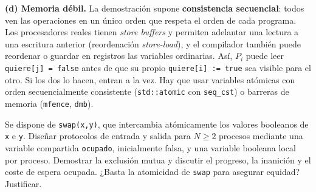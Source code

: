 \documentclass[11pt,a4paper,oneside]{report}
\begin{document}
\begin{solucion}
\textbf{(d) Memoria débil.} La demostración supone \textbf{consistencia secuencial}: todos ven las operaciones en un
único orden que respeta el orden de cada programa. Los procesadores reales tienen \emph{store buffers} y permiten
adelantar una lectura a una escritura anterior (reordenación \emph{store-load}), y el compilador también puede
reordenar o guardar en registros las variables ordinarias. Así, $P_i$ puede leer \texttt{quiere[j] = false} antes de
que su propio \texttt{quiere[i] := true} sea visible para el otro. Si los dos lo hacen, entran a la vez. Hay que usar
variables atómicas con orden secuencialmente consistente (\texttt{std::atomic} con \texttt{seq\_cst}) o barreras
de memoria (\texttt{mfence}, \texttt{dmb}).
\end{solucion}

\begin{ejercicio}
Se dispone de \texttt{swap(x,y)}, que intercambia atómicamente los valores booleanos de \texttt{x} e \texttt{y}.
Diseñar protocolos de entrada y salida para $N \ge 2$ procesos mediante una variable compartida \texttt{ocupado},
inicialmente falsa, y una variable booleana local por proceso. Demostrar la exclusión mutua y discutir el
progreso, la inanición y el coste de espera ocupada. ¿Basta la atomicidad de \texttt{swap} para asegurar equidad?
Justificar.
\end{ejercicio}
\end{document}
